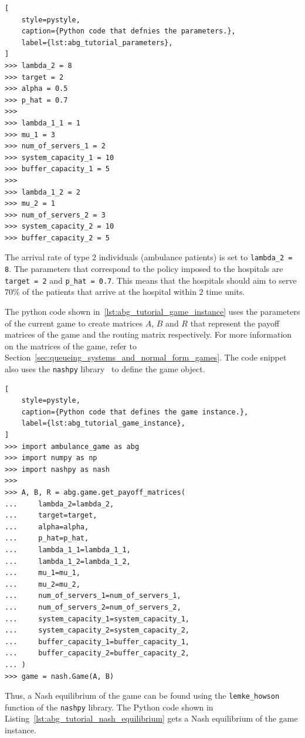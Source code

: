 \begin{lstlisting}[
    style=pystyle,
    caption={Python code that defnies the parameters.},
    label={lst:abg_tutorial_parameters},
]
>>> lambda_2 = 8
>>> target = 2
>>> alpha = 0.5
>>> p_hat = 0.7
>>>
>>> lambda_1_1 = 1
>>> mu_1 = 3
>>> num_of_servers_1 = 2
>>> system_capacity_1 = 10
>>> buffer_capacity_1 = 5
>>>
>>> lambda_1_2 = 2
>>> mu_2 = 1
>>> num_of_servers_2 = 3
>>> system_capacity_2 = 10
>>> buffer_capacity_2 = 5

\end{lstlisting}

The arrival rate of type 2 individuals (ambulance patients) is set to
\texttt{lambda\_2 = 8}.
The parameters that correspond to the policy imposed to the hospitals are
\texttt{target = 2} and \texttt{p\_hat = 0.7}.
This means that the hospitals should aim to serve \(70\%\) of the patients
that arrive at the hospital within \(2\) time units.

The python code shown in~\ref{lst:abg_tutorial_game_instance} uses the
parameters of the current game to create matrices \(A\), \(B\) and \(R\)
that represent the payoff matrices of the game and the routing matrix
respectively.
For more information on the matrices of the game, refer to
Section~\ref{sec:queueing_systems_and_normal_form_games}.
The code snippet also uses the \texttt{nashpy} library~\cite{thenashpyproject}
to define the game object.

\begin{lstlisting}[
    style=pystyle,
    caption={Python code that defines the game instance.},
    label={lst:abg_tutorial_game_instance},
]
>>> import ambulance_game as abg
>>> import numpy as np
>>> import nashpy as nash
>>>
>>> A, B, R = abg.game.get_payoff_matrices(
...     lambda_2=lambda_2,
...     target=target,
...     alpha=alpha,
...     p_hat=p_hat,
...     lambda_1_1=lambda_1_1,
...     lambda_1_2=lambda_1_2,
...     mu_1=mu_1,
...     mu_2=mu_2,
...     num_of_servers_1=num_of_servers_1,
...     num_of_servers_2=num_of_servers_2,
...     system_capacity_1=system_capacity_1,
...     system_capacity_2=system_capacity_2,
...     buffer_capacity_1=buffer_capacity_1,
...     buffer_capacity_2=buffer_capacity_2,
... )
>>> game = nash.Game(A, B)

\end{lstlisting}

Thus, a Nash equilibrium of the game can be found using the
\texttt{lemke\_howson} function of the \texttt{nashpy} library.
The Python code shown in Listing~\ref{lst:abg_tutorial_nash_equilibrium}
gets a Nash equilibrium of the game instance.

